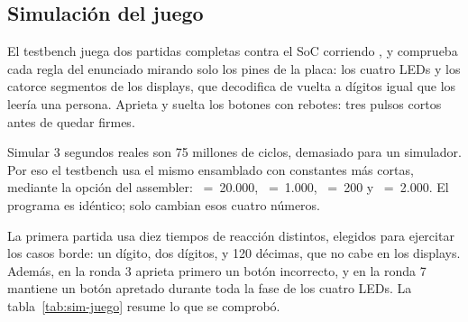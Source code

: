 \subsection{Simulación del juego}

El testbench  juega dos partidas completas contra el SoC corriendo
, y comprueba cada regla del enunciado mirando solo los pines de la placa:
los cuatro LEDs y los catorce segmentos de los displays, que decodifica de vuelta a
dígitos igual que los leería una persona. Aprieta y suelta los botones con rebotes: tres
pulsos cortos antes de quedar firmes.

Simular 3 segundos reales son 75 millones de ciclos, demasiado para un simulador. Por
eso el testbench usa el mismo  ensamblado con constantes más cortas,
mediante la opción  del assembler: ~=~20.000,
~=~1.000, ~=~200 y
~=~2.000. El programa es idéntico; solo cambian esos cuatro números.

La primera partida usa diez tiempos de reacción distintos, elegidos para ejercitar los
casos borde: un dígito, dos dígitos, y 120 décimas, que no cabe en los displays. Además,
en la ronda 3 aprieta primero un botón incorrecto, y en la ronda 7 mantiene un botón
apretado durante toda la fase de los cuatro LEDs. La tabla~\ref{tab:sim-juego} resume lo
que se comprobó.


